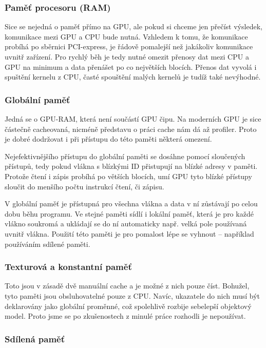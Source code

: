 \subsubsection{Paměť procesoru (RAM)}

Sice se nejedná o paměť přímo na GPU, ale pokud si chceme jen přečíst výsledek, komunikace mezi GPU a CPU bude nutná. Vzhledem k tomu, že komunikace probíhá po sběrnici PCI-express, je řádově pomalejší než jakákoliv komunikace uvnitř zařízení. Pro rychlý běh je tedy nutné omezit přenosy dat mezi CPU a GPU na minimum a data přenášet po co největších blocích. Přenos dat vyvolá i spuštění kernelu z CPU, časté spouštění malých kernelů je tudíž také nevýhodné.

\subsubsection{Globální paměť}

Jedná se o GPU-RAM, která není součástí GPU čipu. Na moderních GPU je sice částečně cacheovaná, nicméně představu o práci cache nám dá až profiler. Proto je dobré dodržovat i při přístupu do této paměti některá omezení.

Nejefektivnějšího přístupu do globální paměti se dosáhne pomocí sloučených přístupů, tedy pokud vlákna s blízkými ID přistupují na blízké adresy v paměti. Protože čtení i zápis probíhá po větších blocích, umí GPU tyto blízké přístupy sloučit do menšího počtu instrukcí čtení, či zápisu.

V globální paměť je přístupná pro všechna vlákna a data v ní zůstávají po celou dobu běhu programu. Ve stejné paměti sídlí i lokální paměť, která je pro každé vlákno soukromá a ukládají se do ní automaticky např. velká pole používaná uvnitř vlákna. Použití této paměti je pro pomalost lépe se vyhnout -- například používáním sdílené paměti.

\subsubsection{Texturová a konstantní paměť}

Toto jsou v zásadě dvě manuální cache a je možné z nich pouze číst. Bohužel, tyto paměti jsou obsluhovatelné pouze z CPU. Navíc, ukazatele do nich musí být deklarovány jako globální proměnné, což spolehlivě rozbije sebelepší objektový model. Proto jsme se po zkušenostech z minulé práce  rozhodli je nepoužívat.

\subsubsection{Sdílená paměť}

